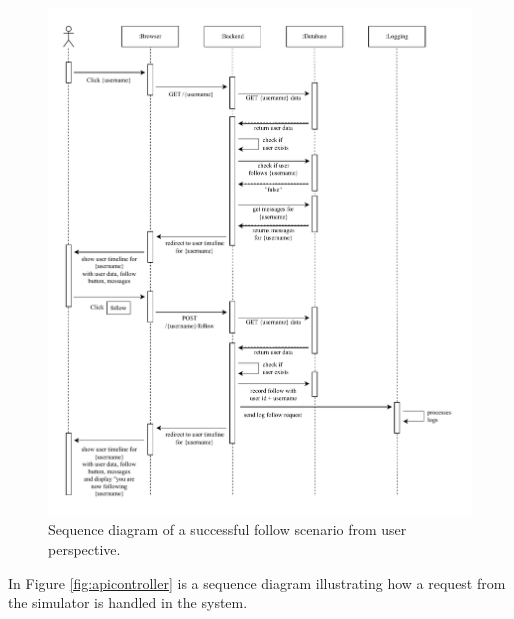 \begin{figure}[H]
  \begin{center}
\includegraphics[width=\textwidth]{images/figures/Sequence-client.pdf}
    \caption{Sequence diagram of a successful follow scenario from user perspective.}
    \label{fig:homecontroller}
  \end{center}
\end{figure}

In Figure \ref{fig:apicontroller} is a sequence diagram illustrating how a request from the simulator is handled in the system.\newline

